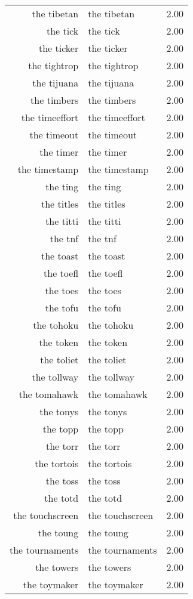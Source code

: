 \begin{table}[ht]
\begin{tabular}{rlr}
  the tibetan & the tibetan & 2.00 \\ 
  the tick & the tick & 2.00 \\ 
  the ticker & the ticker & 2.00 \\ 
  the tightrop & the tightrop & 2.00 \\ 
  the tijuana & the tijuana & 2.00 \\ 
  the timbers & the timbers & 2.00 \\ 
  the timeeffort & the timeeffort & 2.00 \\ 
  the timeout & the timeout & 2.00 \\ 
  the timer & the timer & 2.00 \\ 
  the timestamp & the timestamp & 2.00 \\ 
  the ting & the ting & 2.00 \\ 
  the titles & the titles & 2.00 \\ 
  the titti & the titti & 2.00 \\ 
  the tnf & the tnf & 2.00 \\ 
  the toast & the toast & 2.00 \\ 
  the toefl & the toefl & 2.00 \\ 
  the toes & the toes & 2.00 \\ 
  the tofu & the tofu & 2.00 \\ 
  the tohoku & the tohoku & 2.00 \\ 
  the token & the token & 2.00 \\ 
  the toliet & the toliet & 2.00 \\ 
  the tollway & the tollway & 2.00 \\ 
  the tomahawk & the tomahawk & 2.00 \\ 
  the tonys & the tonys & 2.00 \\ 
  the topp & the topp & 2.00 \\ 
  the torr & the torr & 2.00 \\ 
  the tortois & the tortois & 2.00 \\ 
  the toss & the toss & 2.00 \\ 
  the totd & the totd & 2.00 \\ 
  the touchscreen & the touchscreen & 2.00 \\ 
  the toung & the toung & 2.00 \\ 
  the tournaments & the tournaments & 2.00 \\ 
  the towers & the towers & 2.00 \\ 
  the toymaker & the toymaker & 2.00 \\ 

\end{tabular}
\end{table}
